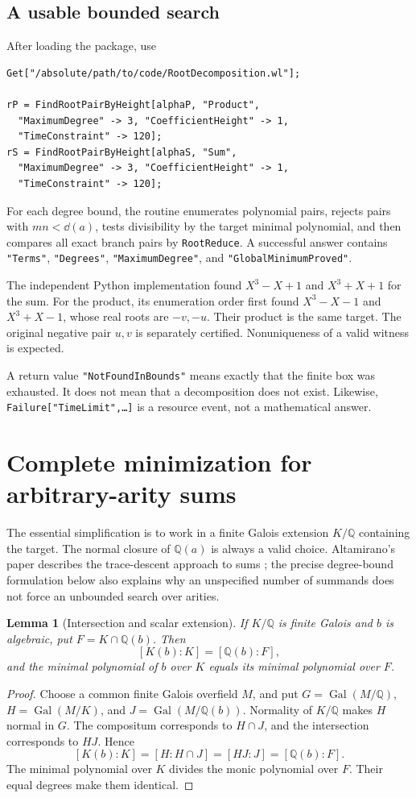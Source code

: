 \documentclass[11pt,a4paper]{article}
\newtheorem{lemma}[theorem]{Lemma}
\theoremstyle{definition}\newtheorem{definition}[theorem]{Definition}
\theoremstyle{remark}\newtheorem{remark}[theorem]{Remark}
\newcommand{\Q}{\mathbb Q}\newcommand{\C}{\mathbb C}\newcommand{\Z}{\mathbb Z}
\newcommand{\Gal}{\operatorname{Gal}}\newcommand{\Tr}{\operatorname{Tr}}
\newcommand{\wl}[1]{\texttt{#1}}
\begin{document}
\subsection{A usable bounded search}
After loading the package, use
\begin{lstlisting}
Get["/absolute/path/to/code/RootDecomposition.wl"];

rP = FindRootPairByHeight[alphaP, "Product",
  "MaximumDegree" -> 3, "CoefficientHeight" -> 1,
  "TimeConstraint" -> 120];
rS = FindRootPairByHeight[alphaS, "Sum",
  "MaximumDegree" -> 3, "CoefficientHeight" -> 1,
  "TimeConstraint" -> 120];
\end{lstlisting}
For each degree bound, the routine enumerates polynomial pairs, rejects pairs with $mn<\dd(a)$, tests divisibility by the target minimal polynomial, and then compares all exact branch pairs by \wl{RootReduce}. A successful answer contains \wl{"Terms"}, \wl{"Degrees"}, \wl{"MaximumDegree"}, and \wl{"GlobalMinimumProved"}.

The independent Python implementation found $X^3-X+1$ and $X^3+X+1$ for the sum. For the product, its enumeration order first found $X^3-X-1$ and $X^3+X-1$, whose real roots are $-v,-u$. Their product is the same target. The original negative pair $u,v$ is separately certified. Nonuniqueness of a valid witness is expected.

A return value \wl{"NotFoundInBounds"} means exactly that the finite box was exhausted. It does not mean that a decomposition does not exist. Likewise, \wl{Failure["TimeLimit",\ldots]} is a resource event, not a mathematical answer.

\section{Complete minimization for arbitrary-arity sums}
\label{sec:sums}
The essential simplification is to work in a finite Galois extension $K/\Q$ containing the target. The normal closure of $\Q(a)$ is always a valid choice. Altamirano's paper describes the trace-descent approach to sums \cite{altamirano}; the precise degree-bound formulation below also explains why an unspecified number of summands does not force an unbounded search over arities.

\begin{lemma}[Intersection and scalar extension]
\label{lem:intersection}
If $K/\Q$ is finite Galois and $b$ is algebraic, put $F=K\cap\Q(b)$. Then
\[
 [K(b):K]=[\Q(b):F],
\]
and the minimal polynomial of $b$ over $K$ equals its minimal polynomial over $F$.
\end{lemma}
\begin{proof}
Choose a common finite Galois overfield $M$, and put
$G=\Gal(M/\Q)$, $H=\Gal(M/K)$, and $J=\Gal(M/\Q(b))$.
Normality of $K/\Q$ makes $H$ normal in $G$. The compositum corresponds to $H\cap J$, and the intersection corresponds to $HJ$. Hence
\[
 [K(b):K]=[H:H\cap J]=[HJ:J]=[\Q(b):F].
\]
The minimal polynomial over $K$ divides the monic polynomial over $F$. Their equal degrees make them identical.
\end{proof}
\end{document}

